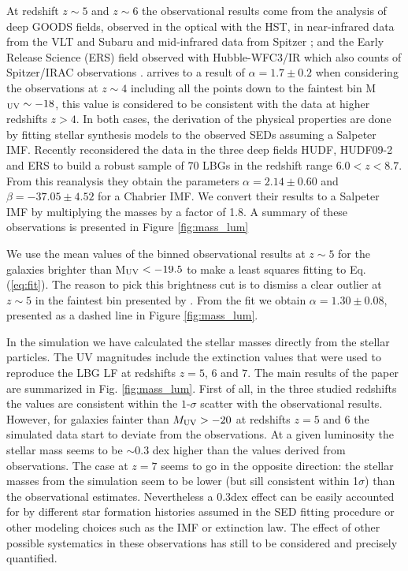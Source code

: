 \documentclass{emulateapj}
\begin{document}
At redshift $z\sim 5$ and $z\sim 6$ the observational results come from the analysis of
deep GOODS fields, observed in the optical with the HST, in
near-infrared data from the VLT and Subaru and mid-infrared data from
Spitzer \citep{2009ApJ...697.1493S}; and the
Early Release Science (ERS) field observed with Hubble-WFC3/IR which
also counts of Spitzer/IRAC observations
\citep{2011ApJ...735L..34G}. \citet{2011ApJ...735L..34G} arrives to a result of
$\alpha =1.7\pm 0.2$ when considering the observations at $z\sim 4$
including all the points down to the faintest bin M$_{\rm  UV}\sim
-18$, this value is considered to be consistent with the data at
higher redshifts $z>4$. In both cases, the derivation of the
physical properties are done by fitting stellar synthesis models to
the observed SEDs assuming a Salpeter IMF.  Recently
\citep{2011MNRAS.418.2074M} reconsidered the data in the three deep
fields HUDF, HUDF09-2 and ERS to build a robust sample of $70$
LBGs in the redshift range $6.0<z<8.7$. From this
reanalysis they obtain the parameters $\alpha=2.14\pm0.60$ and
$\beta=-37.05\pm 4.52$ for a Chabrier IMF. We convert their results to a
Salpeter IMF by multiplying the masses by a factor of 1.8. A summary of these observations is presented in Figure \ref{fig:mass_lum}


We use the mean values of the binned observational results at $z\sim
5$ for the galaxies brighter than M$_{\rm UV}<-19.5$
\citep{2009ApJ...697.1493S,2011ApJ...735L..34G} to
make a least squares fitting to Eq. (\ref{eq:fit}). The reason
to pick this brightness cut is to dismiss a clear outlier at $z\sim 5$
in the faintest bin presented by \citet{2011ApJ...735L..34G}. From the
fit we obtain $\alpha=1.30\pm 0.08$, presented as a dashed line in  Figure
\ref{fig:mass_lum}. 

In the simulation we have calculated the stellar masses directly from the
stellar particles. The UV magnitudes include the extinction values
that were used to reproduce the LBG LF at redshifts $z=5$, $6$ and
$7$. The main results of the paper are summarized in
Fig. \ref{fig:mass_lum}. First of all, in the three studied redshifts
the values are consistent within the $1$-$\sigma$ scatter with the
observational results. However, for galaxies fainter than $M_{\rm
  UV}>-20$ at redshifts $z=5$ and $6$ the simulated data start to
deviate from the observations. At a given luminosity the
stellar mass seems to be $\sim 0.3$ dex higher than the values derived from
observations. The case at $z=7$ seems to go in the opposite
direction: the stellar masses from the simulation seem to be
lower (but sill consistent within 1$\sigma$) than the observational
estimates. Nevertheless a 0.3dex effect can be easily accounted for by different star formation histories assumed in the SED fitting procedure or other modeling choices such as the IMF or extinction law. The effect of other possible systematics in these observations has still to be considered and precisely quantified.
\end{document}

